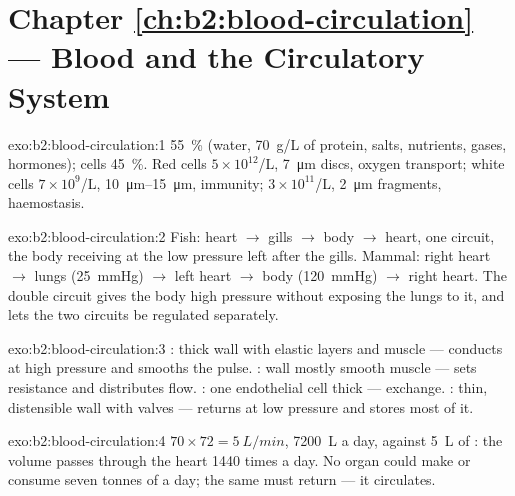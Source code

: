 \section*{Chapter \ref{ch:b2:blood-circulation} --- Blood and the Circulatory System}

\begin{solution}{exo:b2:blood-circulation:1}
 \qty{55}{\%} (water, \qty{70}{g/L} of protein, salts,
nutrients, gases, hormones); cells \qty{45}{\%}. Red cells $5\times
10^{12}$/L, \qty{7}{\micro m} discs, oxygen transport; white cells
$7\times 10^{9}$/L, \qtyrange{10}{15}{\micro m}, immunity; 
$3\times 10^{11}$/L, \qty{2}{\micro m} fragments, haemostasis.
\end{solution}

\begin{solution}{exo:b2:blood-circulation:2}
Fish: heart $\to$ gills $\to$ body $\to$ heart, one circuit, the body
receiving  at the low pressure left after the gills. Mammal:
right heart $\to$ lungs (\qty{25}{mmHg}) $\to$ left heart $\to$ body
(\qty{120}{mmHg}) $\to$ right heart. The double circuit gives the
body high pressure without exposing the lungs to it, and lets the
two circuits be regulated separately.
\end{solution}

\begin{solution}{exo:b2:blood-circulation:3}
: thick wall with elastic layers and muscle --- conducts 
at high pressure and smooths the pulse. : wall mostly
smooth muscle --- sets resistance and distributes flow. :
one endothelial cell thick --- exchange. : thin, distensible
wall with valves --- returns  at low pressure and stores most
of it.
\end{solution}

\begin{solution}{exo:b2:blood-circulation:4}
$70\times 72 = \qty{5}{L/min}$, \qty{7200}{L} a day, against
\qty{5}{L} of : the volume passes through the heart \num{1440}
times a day. No organ could make or consume seven tonnes of  a
day; the same  must return --- it circulates.
\end{solution}

